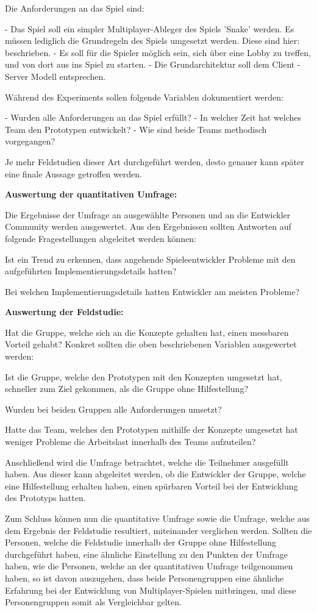 Die Anforderungen an das Spiel sind:

- Das Spiel soll ein simpler Multiplayer-Ableger des Spiels 'Snake' werden. Es müssen lediglich die Grundregeln des Spiels umgesetzt werden. Diese sind hier: \cite{.22.02.2022} beschrieben.
- Es soll für die Spieler möglich sein, sich über eine Lobby zu treffen, und von dort aus ins Spiel zu starten.
- Die Grundarchitektur soll dem Client - Server Modell entsprechen.

Während des Experiments sollen folgende Variablen dokumentiert werden:

- Wurden alle Anforderungen an das Spiel erfüllt?
- In welcher Zeit hat welches Team den Prototypen entwickelt?
- Wie sind beide Teams methodisch vorgegangen?

Je mehr Feldstudien dieser Art durchgeführt werden, desto genauer kann später eine finale Aussage getroffen werden.

\textbf{Auswertung der quantitativen Umfrage:}

Die Ergebnisse der Umfrage an ausgewählte Personen und an die Entwickler Community werden ausgewertet. Aus den Ergebnissen sollten Antworten auf folgende Fragestellungen abgeleitet werden können:

Ist ein Trend zu erkennen, dass angehende Spieleentwickler Probleme mit den aufgeführten Implementierungsdetails hatten?

Bei welchen Implementierungsdetails hatten Entwickler am meisten Probleme?

\textbf{Auswertung der Feldstudie:}

Hat die Gruppe, welche sich an die Konzepte gehalten hat, einen messbaren Vorteil gehabt? Konkret sollten die oben beschriebenen Variablen ausgewertet werden:

Ist die Gruppe, welche den Prototypen mit den Konzepten umgesetzt hat, schneller zum Ziel gekommen, als die Gruppe ohne Hilfestellung?

Wurden bei beiden Gruppen alle Anforderungen umsetzt?

Hatte das Team, welches den Prototypen mithilfe der Konzepte umgesetzt hat weniger Probleme die Arbeitslast innerhalb des Teams aufzuteilen?

Anschließend wird die Umfrage betrachtet, welche die Teilnehmer ausgefüllt haben. Aus dieser kann abgeleitet werden, ob die Entwickler der Gruppe, welche eine Hilfestellung erhalten haben, einen spürbaren Vorteil bei der Entwicklung des Prototyps hatten.

Zum Schluss können nun die quantitative Umfrage sowie die Umfrage, welche aus dem Ergebnis der Feldstudie resultiert, miteinander verglichen werden. Sollten die Personen, welche die Feldstudie innerhalb der Gruppe ohne Hilfestellung durchgeführt haben, eine ähnliche Einstellung zu den Punkten der Umfrage haben, wie die Personen, welche an der quantitativen Umfrage teilgenommen haben, so ist davon auszugehen, dass beide Personengruppen eine ähnliche Erfahrung bei der Entwicklung von Multiplayer-Spielen mitbringen, und diese Personengruppen somit als Vergleichbar gelten.

